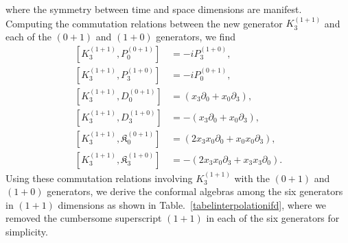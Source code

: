 \documentclass[%
 reprint,
superscriptaddress,
 amsmath,amssymb,
 aps,
]{revtex4-2}
\begin{document}
where the symmetry between time and space 
dimensions are manifest.
Computing the commutation relations between the new generator $K_{3}^{(1+1)}$ and each of the $(0+1)$ and $(1+0)$ generators, we find
\begin{align}
    \left[K_{3}^{(1+1)}, P^{(0+1)}_{0}\right] &= -iP^{(1+0)}_{3},\\
    \left[K_{3}^{(1+1)}, P^{(1+0)}_{3}\right] &= -iP^{(0+1)}_{0},\\
    \left[K_{3}^{(1+1)}, D^{(0+1)}_{0}\right] &=(x_{3}\partial_{0}+x_{0}\partial_{3}),\\
    \left[K_{3}^{(1+1)}, D^{(1+0)}_{3}\right] &=-(x_{3}\partial_{0}+x_{0}\partial_{3}),\\
    \left[K_{3}^{(1+1)}, \mathfrak{K}^{(0+1)}_{0}\right] &=(2x_{3}x_{0}\partial_{0}+x_{0}x_{0}\partial_{3}),\\
    \left[K_{3}^{(1+1)}, \mathfrak{K}^{(1+0)}_{3}\right] &=-(2x_{3}x_{0}\partial_{3}+x_{3}x_{3}\partial_{0}).
\end{align}
Using these commutation relations involving $K_{3}^{(1+1)}$ with the $(0+1)$ and $(1+0)$ generators, we derive the conformal algebras among the six generators in $(1+1)$ dimensions as shown in Table.~\ref{tabelinterpolationifd}, where we removed the cumbersome superscript $(1+1)$ in each of the six generators for simplicity. 
\end{document}
